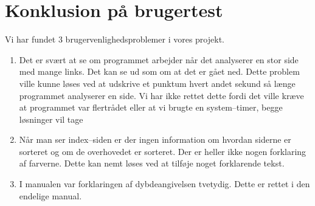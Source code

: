 \documentclass[a4paper,oneside,article]{memoir}
\begin{document}
\section{Konklusion på brugertest}
Vi har fundet 3 brugervenlighedsproblemer i vores projekt.
\begin{enumerate}
\item Det er svært at se om programmet arbejder når det analyserer en
  stor side med mange links. Det kan se ud som om at det er gået
  ned. Dette problem ville kunne løses ved at udskrive et punktum
  hvert andet sekund så længe programmet analyserer en side. Vi har
  ikke rettet dette fordi det ville kræve at programmet var flertrådet
  eller at vi brugte en system--timer, begge løsninger vil tage
\item Når man ser index--siden er der ingen information om hvordan
  siderne er sorteret og om de overhovedet er sorteret. Der er heller
  ikke nogen forklaring af farverne. Dette kan nemt løses ved at
  tilføje noget forklarende tekst.
\item I manualen var forklaringen af dybdeangivelsen tvetydig. Dette
  er rettet i den endelige manual.
\end{enumerate}
\end{document}

